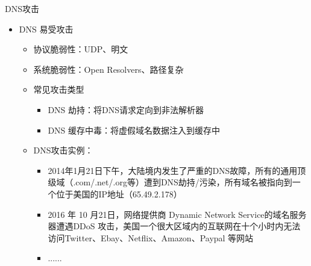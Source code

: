 \documentclass{beamer}
\begin{document}
\begin{frame}{DNS攻击}
  \begin{itemize}
    \item DNS 易受攻击
      \begin{itemize}
        \item 协议脆弱性：UDP、明文
        \item 系统脆弱性：Open Resolvers、路径复杂
        \item 常见攻击类型
        \begin{itemize}
          \item DNS 劫持：将DNS请求定向到非法解析器
          \item DNS 缓存中毒：将虚假域名数据注入到缓存中
        \end{itemize}
        \item DNS攻击实例：
        \begin{itemize}
          \item 2014年1月21日下午，大陆境内发生了严重的DNS故障，所有的通用顶级域（.com/.net/.org等）遭到DNS劫持/污染，所有域名被指向到一个位于美国的IP地址（65.49.2.178）
          \item  2016 年 10 月21日，网络提供商 Dynamic Network Service的域名服务器遭遇DDoS 攻击，美国一个很大区域内的互联网在十个小时内无法访问Twitter、Ebay、Netflix、Amazon、Paypal 等网站
          \item ......
        \end{itemize}    
      \end{itemize}
  \end{itemize}
\end{frame}

\end{document}
